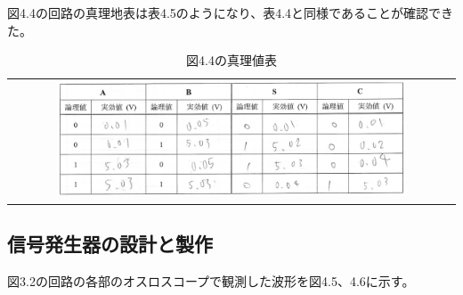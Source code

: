 \documentclass{jlreq}
\numberwithin{equation}{section}
\begin{document}
図4.4の回路の真理地表は表4.5のようになり、表4.4と同様であることが確認できた。

\begin{table}[H]
  \centering
  \caption{図4.4の真理値表}
  \begin{tabular}{c}
    \includegraphics[width=0.8\textwidth]{assets/hanandnotshinri.png} \\
  \end{tabular}
\end{table}

\subsection{信号発生器の設計と製作}
図3.2の回路の各部のオスロスコープで観測した波形を図4.5、4.6に示す。
\end{document}
